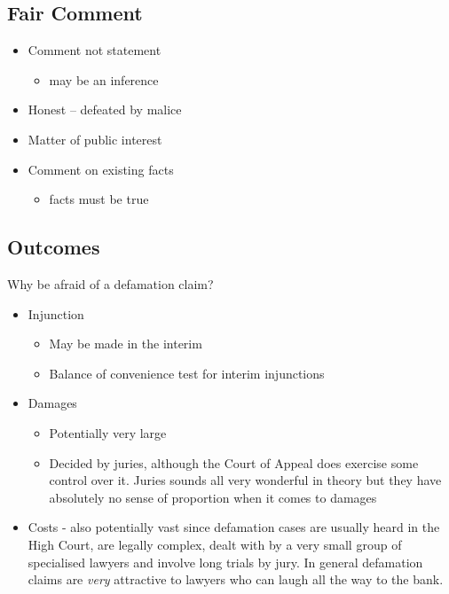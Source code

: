 \documentclass[]{article}
\begin{document}
\subsection{Fair Comment}

\begin{itemize}
\item
  Comment not statement

  \begin{itemize}
  \item
    may be an inference
  \end{itemize}
\item
  Honest -- defeated by malice
\item
  Matter of public interest
\item
  Comment on existing facts

  \begin{itemize}
  \item
    facts must be true
  \end{itemize}
\end{itemize}

\subsection{Outcomes}

Why be afraid of a defamation claim?

\begin{itemize}
\item
  Injunction

  \begin{itemize}
  \item
    May be made in the interim
  \item
    Balance of convenience test for interim injunctions
  \end{itemize}
\item
  Damages

  \begin{itemize}
  \item
    Potentially very large
  \item
    Decided by juries, although the Court of Appeal does exercise some
    control over it. Juries sounds all very wonderful in theory but they
    have absolutely no sense of proportion when it comes to damages
  \end{itemize}
\item
  {{Costs - also potentially vast since defamation cases are usually
  heard in the High Court, are legally complex, dealt with by a very
  small group of specialised lawyers and involve long trials by jury. In
  general defamation claims are }}\emph{{very }}{{attractive to lawyers
  who can laugh all the way to the bank.}}
\end{itemize}
\end{document}
